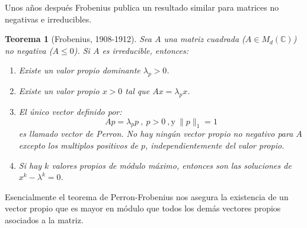 \documentclass[size=a4, parskip=half, titlepage=false, toc=flat, toc=bib, 12pt]{scrartcl}
\theoremstyle{theorem-style}
\newtheorem{nth}{Teorema}[section]
\theoremstyle{definition-style}
\theoremstyle{remark-style}
\theoremstyle{example-style}
\theoremstyle{definition-style}
\theoremstyle{remark-style}
\begin{document}
Unos años después Frobenius publica un resultado similar para matrices no negativas e irreducibles.

\begin{nth}[Frobenius, 1908-1912]
Sea $A $ una matriz cuadrada ($A \in M_d(\mathbb{C})$) no negativa ($A \leq 0$). Si $A$ es irreducible, entonces:
\begin{enumerate}
\item Existe un valor propio dominante $\lambda_p > 0$.
\item Existe un valor propio $x > 0$ tal que $Ax = \lambda_p x$.
\item El único vector definido por:
$$Ap = \lambda_p p  \ , \ p> 0 \ , \textrm{y} \ \|p\|_1 = 1 $$
es llamado vector de Perron. No hay ningún vector propio no negativo para $A$ excepto los multiplos positivos de $p$, independientemente del valor propio.
\item Si hay $k$ valores propios de módulo máximo, entonces son las soluciones de $x^k - \lambda^k = 0$.
\end{enumerate}
\end{nth}

Esencialmente el teorema de Perron-Frobenius nos asegura la existencia de un vector propio que es mayor en módulo que todos los demás vectores propios asociados a la matriz.
\end{document}

